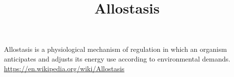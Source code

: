 \documentclass[a4paper]{article}
\title{Allostasis}
\date{}
\begin{document}
    \maketitle
    Allostasis is a physiological mechanism of regulation in which an organism anticipates and adjusts its energy use according to environmental demands. \url{https://en.wikipedia.org/wiki/Allostasis}
\end{document}
